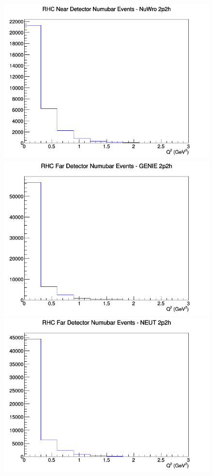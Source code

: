 \documentclass[12pt]{article}
\begin{document}
\begin{figure}[h]
\includegraphics[width=\linewidth]{eff_Q2/FGT/2p2h_RHC_ND_numubar_Q2_NuWro.png}
\endminipage
\newline
{}
\includegraphics[width=\linewidth]{eff_Q2/FGT/2p2h_RHC_FD_numubar_Q2_GENIE.png}
\endminipage
{}
\includegraphics[width=\linewidth]{eff_Q2/FGT/2p2h_RHC_FD_numubar_Q2_NEUT.png}

\end{figure}
\end{document}
